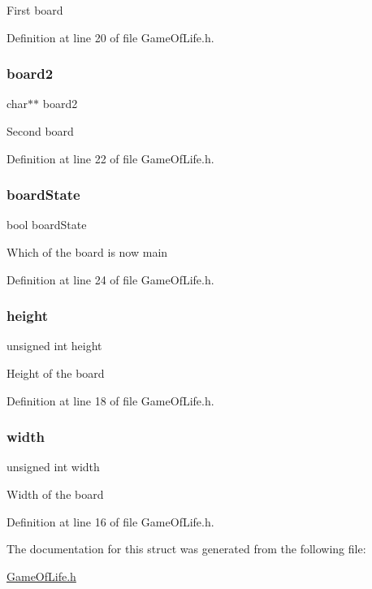 First board 

Definition at line 20 of file Game\+Of\+Life.\+h.

\mbox{\label{struct_game_of_life_a8d9c8d8284d6bd2ee13d4ab4b23cf7e6}} 
\subsubsection{\texorpdfstring{board2}{board2}}
{\footnotesize\ttfamily char$\ast$$\ast$ board2}

Second board 

Definition at line 22 of file Game\+Of\+Life.\+h.

\mbox{\label{struct_game_of_life_ab8eb1dbd4349bf43a07546844e26c678}} 
\subsubsection{\texorpdfstring{board\+State}{boardState}}
{\footnotesize\ttfamily bool board\+State}

Which of the board is now main 

Definition at line 24 of file Game\+Of\+Life.\+h.

\mbox{\label{struct_game_of_life_ab2e78c61905b4419fcc7b4cfc500fe85}} 
\subsubsection{\texorpdfstring{height}{height}}
{\footnotesize\ttfamily unsigned int height}

Height of the board 

Definition at line 18 of file Game\+Of\+Life.\+h.

\mbox{\label{struct_game_of_life_aca34d28e3d8bcbcadb8edb4e3af24f8c}} 
\subsubsection{\texorpdfstring{width}{width}}
{\footnotesize\ttfamily unsigned int width}

Width of the board 

Definition at line 16 of file Game\+Of\+Life.\+h.



The documentation for this struct was generated from the following file\+:\begin{DoxyCompactItemize}
\item 
\mbox{\hyperlink{_game_of_life_8h}{Game\+Of\+Life.\+h}}\end{DoxyCompactItemize}

